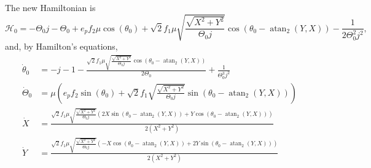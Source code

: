 \documentclass[usenatbib,twocolumn]{mnras}
\begin{document}
The new Hamiltonian is
\begin{equation}
    \mathcal H_0 = - \Theta_{0} j - \Theta_{0} + e_{p} f_{2} \mu \cos{\left(\theta_{0} \right)} + \sqrt{2} f_{1} \mu \sqrt{\frac{\sqrt{X^{2} + Y^{2}}}{\Theta_{0} j}} \cos{\left(\theta_{0} - \operatorname{atan}_{2}{\left(Y,X \right)} \right)} - \frac{1}{2 \Theta_{0}^{2} j^{2}},
\end{equation}
and, by Hamilton's equations,
\begin{align}
   \dot\theta_0 &= - j - 1 - \frac{\sqrt{2} f_{1} \mu \sqrt{\frac{\sqrt{X^{2} + Y^{2}}}{\Theta_{0} j}} \cos{\left(\theta_{0} - \operatorname{atan}_{2}{\left(Y,X \right)} \right)}}{2 \Theta_{0}} + \frac{1}{\Theta_{0}^{3} j^{2}}\\
   \dot\Theta_0 &= \mu \left(e_{p} f_{2} \sin{\left(\theta_{0} \right)} + \sqrt{2} f_{1} \sqrt{\frac{\sqrt{X^{2} + Y^{2}}}{\Theta_{0} j}} \sin{\left(\theta_{0} - \operatorname{atan}_{2}{\left(Y,X \right)} \right)}\right)\\
   \dot X &= \frac{\sqrt{2} f_{1} \mu \sqrt{\frac{\sqrt{X^{2} + Y^{2}}}{\Theta_{0} j}} \left(2 X \sin{\left(\theta_{0} - \operatorname{atan}_{2}{\left(Y,X \right)} \right)} + Y \cos{\left(\theta_{0} - \operatorname{atan}_{2}{\left(Y,X \right)} \right)}\right)}{2 \left(X^{2} + Y^{2}\right)} \\
   \dot Y &= \frac{\sqrt{2} f_{1} \mu \sqrt{\frac{\sqrt{X^{2} + Y^{2}}}{\Theta_{0} j}} \left(- X \cos{\left(\theta_{0} - \operatorname{atan}_{2}{\left(Y,X \right)} \right)} + 2 Y \sin{\left(\theta_{0} - \operatorname{atan}_{2}{\left(Y,X \right)} \right)}\right)}{2 \left(X^{2} + Y^{2}\right)}
\end{align}
\end{document}
